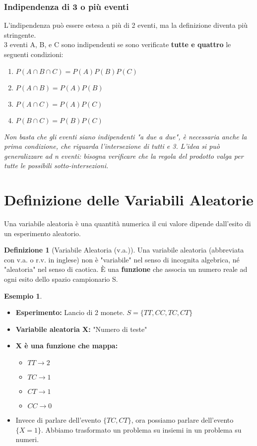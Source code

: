 \documentclass[a4paper, 11pt]{article}
\theoremstyle{definition}
\newtheorem{definizione}{Definizione}[section]
\newtheorem{esempio}{Esempio}[section]
\begin{document}
\subsubsection*{Indipendenza di 3 o più eventi}
L'indipendenza può essere estesa a più di 2 eventi, ma la definizione diventa più stringente. \\
3 eventi A, B, e C sono indipendenti se sono verificate \textbf{tutte e quattro} le seguenti condizioni:
\begin{enumerate}
    \item $P(A \cap B \cap C) = P(A)P(B)P(C)$
    \item $P(A \cap B) = P(A)P(B)$
    \item $P(A \cap C) = P(A)P(C)$
    \item $P(B \cap C) = P(B)P(C)$
\end{enumerate}
\textit{Non basta che gli eventi siano indipendenti "a due a due", è necessaria anche la prima condizione, che riguarda l'intersezione di tutti e 3. L'idea si può generalizzare ad n eventi: bisogna verificare che la regola del prodotto valga per tutte le possibili sotto-intersezioni.}

\newpage

\section{Definizione delle Variabili Aleatorie}
Una variabile aleatoria è una quantità numerica il cui valore dipende dall'esito di un esperimento aleatorio.

\begin{definizione}[Variabile Aleatoria (v.a.)]
Una variabile aleatoria (abbreviata con v.a. o r.v. in inglese) non è "variabile" nel senso di incognita algebrica, né "aleatoria" nel senso di caotica. È una \textbf{funzione} che associa un numero reale ad ogni esito dello spazio campionario S.
\end{definizione}

\begin{esempio}
\
\begin{itemize}
    \item \textbf{Esperimento:} Lancio di 2 monete. $S = \{TT, CC, TC, CT\}$
    \item \textbf{Variabile aleatoria X:} "Numero di teste"
    \item \textbf{X è una funzione che mappa:}
    \begin{itemize}
        \item $TT \rightarrow 2$
        \item $TC \rightarrow 1$
        \item $CT \rightarrow 1$
        \item $CC \rightarrow 0$
    \end{itemize}
    \item Invece di parlare dell'evento $\{TC, CT\}$, ora possiamo parlare dell'evento $\{X=1\}$. Abbiamo trasformato un problema su insiemi in un problema su numeri.
\end{itemize}
\end{esempio}
\end{document}
